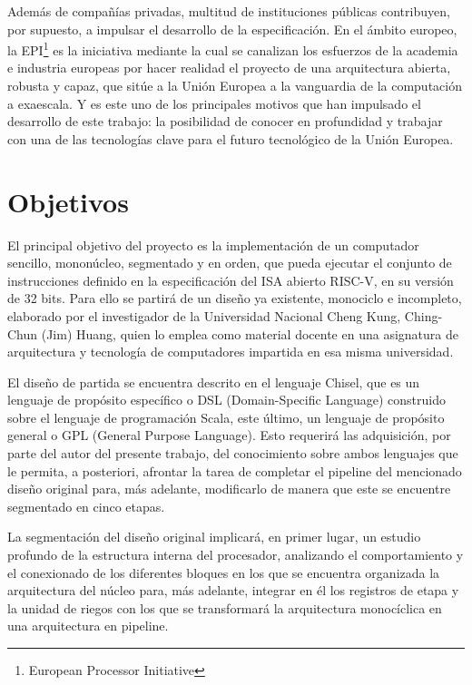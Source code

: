 Además de compañías privadas, multitud de instituciones públicas contribuyen, por supuesto, a impulsar el desarrollo de la especificación. En el ámbito europeo, la EPI\footnote{European Processor Initiative} es la iniciativa mediante la cual se canalizan los esfuerzos de la academia e industria europeas por hacer realidad el proyecto de una arquitectura abierta, robusta y capaz, que sitúe a la Unión Europea a la vanguardia de la computación a exaescala. Y es este uno de los principales motivos que han impulsado el desarrollo de este trabajo: la posibilidad de conocer en profundidad y trabajar con una de las tecnologías clave para el futuro tecnológico de la Unión Europea.


\section{Objetivos}

El principal objetivo del proyecto es la implementación de un computador sencillo, mononúcleo, segmentado y en orden, que pueda ejecutar el conjunto de instrucciones definido en la especificación del ISA abierto RISC-V, en su versión de 32 bits. Para ello se partirá de un diseño ya existente, monociclo e incompleto, elaborado por el investigador de la Universidad Nacional Cheng Kung, Ching-Chun (Jim) Huang, quien lo emplea como material docente en una asignatura de arquitectura y tecnología de computadores impartida en esa misma universidad.

El diseño de partida se encuentra descrito en el lenguaje Chisel, que es un lenguaje de propósito específico o DSL (Domain-Specific Language) construido sobre el lenguaje de programación Scala, este último, un lenguaje de propósito general o GPL (General Purpose Language). Esto requerirá las adquisición, por parte del autor del presente trabajo, del conocimiento sobre ambos lenguajes que le permita, a posteriori, afrontar la tarea de completar el pipeline del mencionado diseño original para, más adelante, modificarlo de manera que este se encuentre segmentado en cinco etapas.

La segmentación del diseño original implicará, en primer lugar, un estudio profundo de la estructura interna del procesador, analizando el comportamiento y el conexionado de los diferentes bloques en los que se encuentra organizada la arquitectura del núcleo para, más adelante, integrar en él los registros de etapa y la unidad de riegos con los que se transformará la arquitectura monocíclica en una arquitectura en pipeline.

